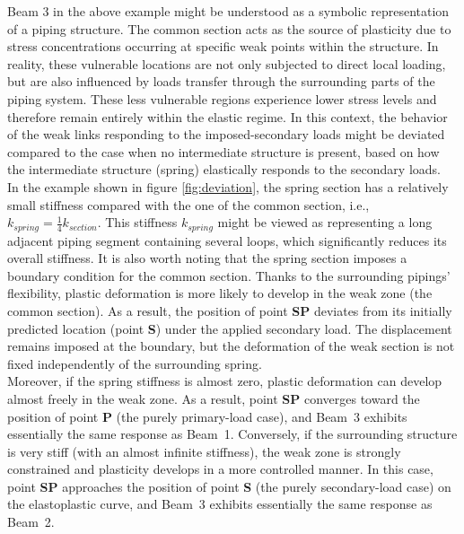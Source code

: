\documentclass[10pt,a4paper]{article}
\begin{document}
Beam 3 in the above example might be understood as a symbolic representation of a piping structure. The common section acts as the source of plasticity due to stress concentrations occurring at specific weak points within the structure. In reality, these vulnerable locations are not only subjected to direct local loading, but are also influenced by loads transfer through the surrounding parts of the piping system. These less vulnerable regions experience lower stress levels and therefore remain entirely within the elastic regime. In this context, the behavior of the weak links responding to the imposed-secondary loads might be deviated compared to the case when no intermediate structure is present, based on how the intermediate structure (spring) elastically responds to the secondary loads. \\

In the example shown in figure \ref{fig:deviation}, the spring section has a relatively small stiffness compared with the one of the common section, i.e., $k_{spring}=\frac{1}{4}k_{section}$. This stiffness $k_{spring}$ might be viewed as representing a long adjacent piping segment containing several loops, which significantly reduces its overall stiffness. It is also worth noting that the spring section imposes a boundary condition for the common section. Thanks to the surrounding pipings' flexibility, plastic deformation is more likely to develop in the weak zone (the common section). As a result, the position of point \textbf{SP} deviates from its initially predicted location (point \textbf{S}) under the applied secondary load. The displacement remains imposed at the boundary, but the deformation of the weak section is not fixed independently of the surrounding spring. \\
Moreover, if the spring stiffness is almost zero, plastic deformation can develop almost freely in the weak zone. As a result, point \textbf{SP} converges toward the position of point \textbf{P} (the purely primary-load case), and Beam~3 exhibits essentially the same response as Beam~1. Conversely, if the surrounding structure is very stiff (with an almost infinite stiffness), the weak zone is strongly constrained and plasticity develops in a more controlled manner. In this case, point \textbf{SP} approaches the position of point \textbf{S} (the purely secondary-load case) on the elastoplastic curve, and Beam~3 exhibits essentially the same response as Beam~2. \\
\end{document}
